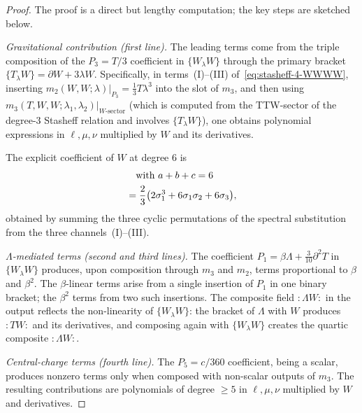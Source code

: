 \begin{proof}
The proof is a direct but lengthy computation; the key steps are sketched below.

\emph{Gravitational contribution (first line).}
The leading terms come from the triple composition of the
$P_3 = T/3$ coefficient in $\{W_\lambda W\}$ through the
primary bracket $\{T_\lambda W\} = \partial W + 3\lambda W$.
Specifically, in terms~(I)--(III) of~\eqref{eq:stasheff-4-WWWW},
inserting $m_2(W,W;\lambda)|_{P_3} = \tfrac{1}{3}T\lambda^3$
into the slot of $m_3$, and then using
$m_3(T,W,W;\lambda_1,\lambda_2)|_{W\text{-sector}}$ (which is
computed from the TTW-sector of the degree-$3$ Stasheff relation
and involves $\{T_\lambda W\}$), one obtains polynomial
expressions in $\ell,\mu,\nu$ multiplied by $W$ and its
derivatives.

The explicit coefficient of $W$ at degree $6$ is
\begin{align}
[\ell^a\mu^b\nu^c\,W]
&\quad\text{with } a+b+c = 6 \notag\\
&= \frac{2}{3}\bigl(
 2\sigma_1^3 + 6\sigma_1\sigma_2 + 6\sigma_3\bigr),
\end{align}
obtained by summing the three cyclic permutations of the
spectral substitution from the three channels~(I)--(III).

\emph{$\Lambda$-mediated terms (second and third lines).}
The coefficient $P_1 = \beta\Lambda + \tfrac{3}{10}\partial^2 T$
in $\{W_\lambda W\}$ produces, upon composition through
$m_3$ and $m_2$, terms proportional to $\beta$ and $\beta^2$.
The $\beta$-linear terms arise from a single insertion of $P_1$
in one binary bracket; the $\beta^2$ terms from two such insertions.
The composite field ${:}\Lambda W{:}$ in the output reflects the
non-linearity of $\{W_\lambda W\}$: the bracket of $\Lambda$ with
$W$ produces ${:}TW{:}$ and its derivatives, and composing again
with $\{W_\lambda W\}$ creates the quartic composite ${:}\Lambda W{:}$.

\emph{Central-charge terms (fourth line).}
The $P_5 = c/360$ coefficient, being a scalar, produces nonzero
terms only when composed with non-scalar outputs of $m_3$.
The resulting contributions are polynomials of degree $\ge 5$
in $\ell,\mu,\nu$ multiplied by $W$ and derivatives.
\end{proof}


